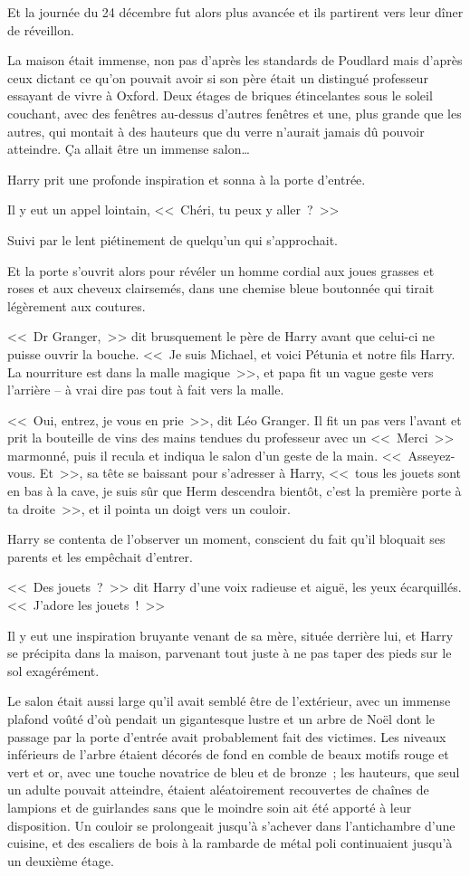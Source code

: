 Et la journée du 24 décembre fut alors plus avancée et ils partirent vers leur dîner de réveillon.

\later

La maison était immense, non pas d'après les standards de Poudlard mais d'après ceux dictant ce qu'on pouvait avoir si son père était un distingué professeur essayant de vivre à Oxford. Deux étages de briques étincelantes sous le soleil couchant, avec des fenêtres au-dessus d'autres fenêtres et une, plus grande que les autres, qui montait à des hauteurs que du verre n'aurait jamais dû pouvoir atteindre. Ça allait être un immense salon…

Harry prit une profonde inspiration et sonna à la porte d'entrée.

Il y eut un appel lointain, <<~Chéri, tu peux y aller~?~>>

Suivi par le lent piétinement de quelqu'un qui s'approchait.

Et la porte s'ouvrit alors pour révéler un homme cordial aux joues grasses et roses et aux cheveux clairsemés, dans une chemise bleue boutonnée qui tirait légèrement aux coutures.

<<~Dr Granger,~>> dit brusquement le père de Harry avant que celui-ci ne puisse ouvrir la bouche. <<~Je suis Michael, et voici Pétunia et notre fils Harry. La nourriture est dans la malle magique~>>, et papa fit un vague geste vers l'arrière -- à vrai dire pas tout à fait vers la malle.

<<~Oui, entrez, je vous en prie~>>, dit Léo Granger. Il fit un pas vers l'avant et prit la bouteille de vins des mains tendues du professeur avec un <<~Merci~>> marmonné, puis il recula et indiqua le salon d'un geste de la main. <<~Asseyez-vous. Et~>>, sa tête se baissant pour s'adresser à Harry, <<~tous les jouets sont en bas à la cave, je suis sûr que Herm descendra bientôt, c'est la première porte à ta droite~>>, et il pointa un doigt vers un couloir.

Harry se contenta de l'observer un moment, conscient du fait qu'il bloquait ses parents et les empêchait d'entrer.

<<~Des jouets~?~>> dit Harry d'une voix radieuse et aiguë, les yeux écarquillés. <<~J'adore les jouets~!~>>

Il y eut une inspiration bruyante venant de sa mère, située derrière lui, et Harry se précipita dans la maison, parvenant tout juste à ne pas taper des pieds sur le sol exagérément.

Le salon était aussi large qu'il avait semblé être de l'extérieur, avec un immense plafond voûté d'où pendait un gigantesque lustre et un arbre de Noël dont le passage par la porte d'entrée avait probablement fait des victimes. Les niveaux inférieurs de l'arbre étaient décorés de fond en comble de beaux motifs rouge et vert et or, avec une touche novatrice de bleu et de bronze~; les hauteurs, que seul un adulte pouvait atteindre, étaient aléatoirement recouvertes de chaînes de lampions et de guirlandes sans que le moindre soin ait été apporté à leur disposition. Un couloir se prolongeait jusqu'à s'achever dans l'antichambre d'une cuisine, et des escaliers de bois à la rambarde de métal poli continuaient jusqu'à un deuxième étage.

